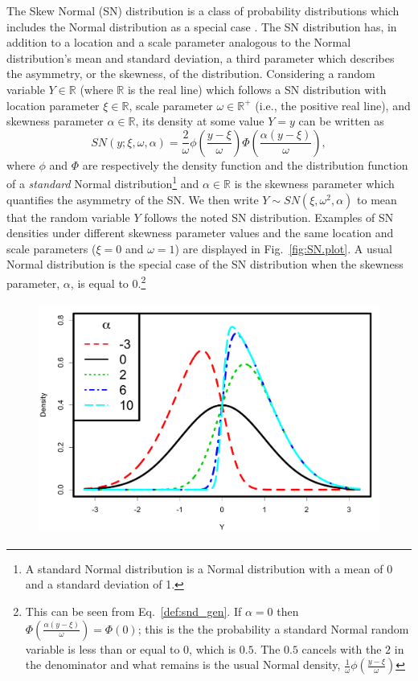 \documentclass[11pt, oneside]{article}
\begin{document}
{The Skew Normal (SN) distribution is a class of probability distributions which includes the Normal distribution as a special case \citep{Azzalini1985}. The SN distribution has, in addition to a location and a scale parameter analogous to the Normal distribution's mean and standard deviation, a third parameter which describes the asymmetry, or the skewness, of the distribution. Considering a random variable $Y\in \mathbb R$ (where $\mathbb R$ is the real line) which follows a SN distribution with location parameter $\xi \in \mathbb R$, scale parameter $\omega \in \mathbb R^{+}$ (i.e., the positive real line), and skewness parameter $\alpha \in \mathbb R$, its density at some value $Y = y$ can be written as 
\begin{equation} \label{def:snd_gen}
SN(y;\xi, \omega, \alpha) = \frac{2}{\omega} \phi\left(\frac{y-\xi}{\omega}\right) \Phi\left(\frac{\alpha(y-\xi)}{\omega}\right),
\end{equation}
where $\phi$ and $\Phi$ are respectively the density function and the distribution function of a \emph{standard} Normal distribution\footnote{A standard Normal distribution is a Normal distribution with a mean of 0 and a standard deviation of 1.}
 and $\alpha \in \mathbb R$ is the skewness parameter which quantifies the asymmetry of the SN.  We then write $Y \sim SN(\xi, \omega^{2}, \alpha)$ to mean that the random variable $Y$ follows the noted SN distribution.
Examples of SN densities under different skewness parameter values and the same location and scale parameters ($\xi = 0$ and $\omega = 1$) are displayed in Fig.~\ref{fig:SN.plot}.  A usual Normal distribution is the special case of the SN distribution when the skewness parameter, $\alpha$, is equal to 0.\footnote{This can be seen from Eq.~\eqref{def:snd_gen}.  If $\alpha = 0$ then $\Phi\left(\frac{\alpha(y-\xi)}{\omega}\right) = \Phi(0)$; this is the the probability a standard Normal random variable is less than or equal to 0, which is $0.5$.  The $0.5$ cancels with the $2$ in the denominator and what remains is the usual Normal density, $\frac{1}{\omega} \phi\left(\frac{y-\xi}{\omega}\right)$}
%
\begin{figure}[htbp]
   \centering
\includegraphics[height = 3in]{Skew_Normal_densities_jjck.pdf} 

\end{figure}}
\end{document}
